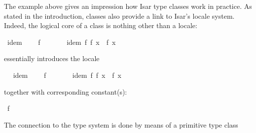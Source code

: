 \begin{isabellebody}
{}
\isamarkuptrue%
%
\isamarkuptrue%
%
\begin{isamarkuptext}%
The example above gives an impression how Isar type classes work in
  practice.  As stated in the introduction, classes also provide a
  link to Isar's locale system.  Indeed, the logical core of a class
  is nothing other than a locale:%
\end{isamarkuptext}%
\isamarkuptrue%
%
\isadelimquote
%
\endisadelimquote
%
\isatagquote
{}\isamarkupfalse%
\ idem\ {\isacharequal}\isanewline
\ \ \ f\ {\isacharcolon}{\isacharcolon}\ {\isachardoublequoteopen}{\isasymalpha}\ {\isasymRightarrow}\ {\isasymalpha}{\isachardoublequoteclose}\isanewline
\ \ \ idem{\isacharcolon}\ {\isachardoublequoteopen}f\ {\isacharparenleft}f\ x{\isacharparenright}\ {\isacharequal}\ f\ x{\isachardoublequoteclose}%
\endisatagquote
{\isafoldquote}%
%
\isadelimquote
%
\endisadelimquote
%
\begin{isamarkuptext}%
\noindent essentially introduces the locale%
\end{isamarkuptext}%
\isamarkuptrue%
\ %
\isadeliminvisible
%
\endisadeliminvisible
%
\isataginvisible
%
\endisataginvisible
{\isafoldinvisible}%
%
\isadeliminvisible
%
\endisadeliminvisible
%
\isadelimquote
%
\endisadelimquote
%
\isatagquote
{}\isamarkupfalse%
\ idem\ {\isacharequal}\isanewline
\ \ \ f\ {\isacharcolon}{\isacharcolon}\ {\isachardoublequoteopen}{\isasymalpha}\ {\isasymRightarrow}\ {\isasymalpha}{\isachardoublequoteclose}\isanewline
\ \ \ idem{\isacharcolon}\ {\isachardoublequoteopen}f\ {\isacharparenleft}f\ x{\isacharparenright}\ {\isacharequal}\ f\ x{\isachardoublequoteclose}%
\endisatagquote
{\isafoldquote}%
%
\isadelimquote
%
\endisadelimquote
%
\begin{isamarkuptext}%
\noindent together with corresponding constant(s):%
\end{isamarkuptext}%
\isamarkuptrue%
%
\isadelimquote
%
\endisadelimquote
%
\isatagquote
{}\isamarkupfalse%
\ f\ {\isacharcolon}{\isacharcolon}\ {\isachardoublequoteopen}{\isasymalpha}\ {\isasymRightarrow}\ {\isasymalpha}{\isachardoublequoteclose}%
\endisatagquote
{\isafoldquote}%
%
\isadelimquote
%
\endisadelimquote
%
\begin{isamarkuptext}%
\noindent The connection to the type system is done by means
  of a primitive type class%
\end{isamarkuptext}%
\isamarkuptrue%

\end{isabellebody}
